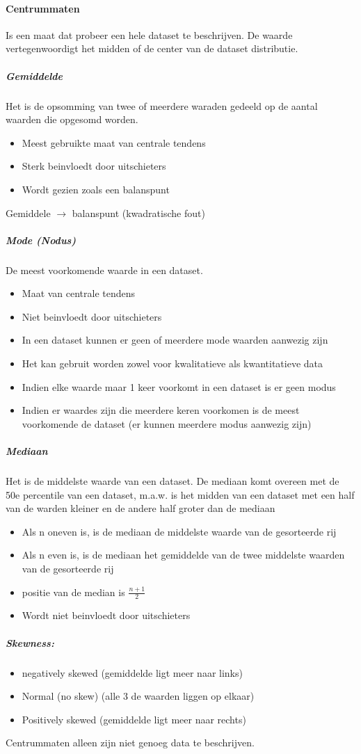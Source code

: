 \documentclass[12pt]{article}
\begin{document}
\paragraph{Centrummaten}
Is een maat dat probeer een hele dataset te beschrijven. De waarde
vertegenwoordigt het midden of de center van de dataset distributie.
\subparagraph{Gemiddelde}
Het is de opsomming van twee of meerdere waraden gedeeld op de aantal
waarden die opgesomd worden.\begin{itemize}
    \item Meest gebruikte maat van centrale tendens 
    \item Sterk beinvloedt door uitschieters 
    \item Wordt gezien zoals een balanspunt
\end{itemize}
Gemiddele $\rightarrow$ balanspunt (kwadratische fout)
\subparagraph{Mode (Nodus)}
De meest voorkomende waarde in een dataset.\begin{itemize}
    \item Maat van centrale tendens 
    \item Niet beinvloedt door uitschieters 
    \item In een dataset kunnen er geen of meerdere mode waarden aanwezig zijn 
    \item Het kan gebruit worden zowel voor kwalitatieve als kwantitatieve data 
\end{itemize}
\begin{itemize}
    \item Indien elke waarde maar 1 keer voorkomt in een dataset is er geen modus 
    \item Indien er waardes zijn die meerdere keren voorkomen is de meest voorkomende de dataset (er kunnen meerdere modus aanwezig zijn)
\end{itemize}
\subparagraph{Mediaan}
Het is de middelste waarde van een dataset. De mediaan komt overeen
met de 50e percentile van een dataset, m.a.w. is het midden van een
dataset met een half van de warden kleiner en de andere half groter dan
de mediaan\begin{itemize}
    \item Als n oneven is, is de mediaan de middelste waarde van de gesorteerde rij 
    \item Als n even is, is de mediaan  het gemiddelde van de twee middelste waarden van de gesorteerde rij 
    \item positie van de median is $\frac{n+1}{2}$
    \item Wordt niet beinvloedt door uitschieters 
\end{itemize}
\subparagraph{Skewness:}
\begin{itemize}
    \item negatively skewed (gemiddelde ligt meer naar links)
    \item Normal (no skew) (alle 3 de waarden liggen op elkaar)
    \item Positively skewed (gemiddelde ligt meer naar rechts)
\end{itemize}
Centrummaten alleen zijn niet genoeg data te beschrijven.
\end{document}
